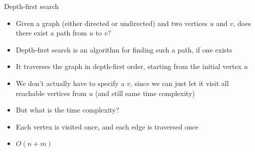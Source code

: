 \documentclass{beamer}
\begin{document}
\begin{frame}[plain]{Depth-first search}
    \begin{itemize}
\item Given a graph (either directed or undirected) and two vertices $u$ and $v$, does there exist a path from $u$ to $v$?
\item Depth-first search is an algorithm for finding such a path, if one exists

\item It traverses the graph in depth-first order, starting from the initial vertex $u$
\item We don't actually have to specify a $v$, since we can just let it visit all reachable vertices from $u$ (and still same time complexity)
\item But what is the time complexity?
\item Each vertex is visited once, and each edge is traversed once
\item $O(n + m)$
    \end{itemize}
\end{frame}
\end{document}
